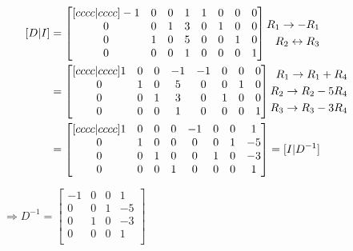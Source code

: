 \documentclass[12pt,letterpaper]{article}
\begin{document}
\begin{enumerate}[leftmargin=*]
\vspace{-2em}
\begin{equation*}
\hspace{-2.5em}\begin{split}
[D | I] 
& = \begin{bmatrix}[cccc|cccc]
-1 & 0 & 0 & 1 & 1 & 0 & 0 & 0\\
 0 & 0 & 1 & 3 & 0 & 1 & 0 & 0\\
 0 & 1 & 0 & 5 & 0 & 0 & 1 & 0\\
 0 & 0 & 0 & 1 & 0 & 0 & 0 & 1\\
\end{bmatrix} \begin{aligned} R_1 \rightarrow -R_1 \\ R_2 \leftrightarrow R_3 \end{aligned} &\\
& = \begin{bmatrix}[cccc|cccc]
1 & 0 & 0 & -1 & -1 & 0 & 0 & 0\\
0 & 1 & 0 &  5 &  0 & 0 & 1 & 0\\
0 & 0 & 1 &  3 &  0 & 1 & 0 & 0\\
0 & 0 & 0 &  1 &  0 & 0 & 0 & 1\\
\end{bmatrix} \begin{aligned} R_1 \rightarrow R_1 + R_4 \\ R_2 \rightarrow R_2 - 5 R_4 \\ R_3 \rightarrow R_3 - 3 R_4 \end{aligned} &\\
& = \begin{bmatrix}[cccc|cccc]
1 & 0 & 0 & 0 & -1 & 0 & 0 &  1\\
0 & 1 & 0 & 0 &  0 & 0 & 1 & -5\\
0 & 0 & 1 & 0 &  0 & 1 & 0 & -3\\
0 & 0 & 0 & 1 &  0 & 0 & 0 &  1\\
\end{bmatrix} = [I | D^{-1}] 
\end{split}
\end{equation*}

$\Rightarrow D^{-1} = \begin{bmatrix}
-1 & 0 & 0 &  1\\
 0 & 0 & 1 & -5\\
 0 & 1 & 0 & -3\\
 0 & 0 & 0 &  1\\
\end{bmatrix}$


\end{enumerate}
\end{document}
